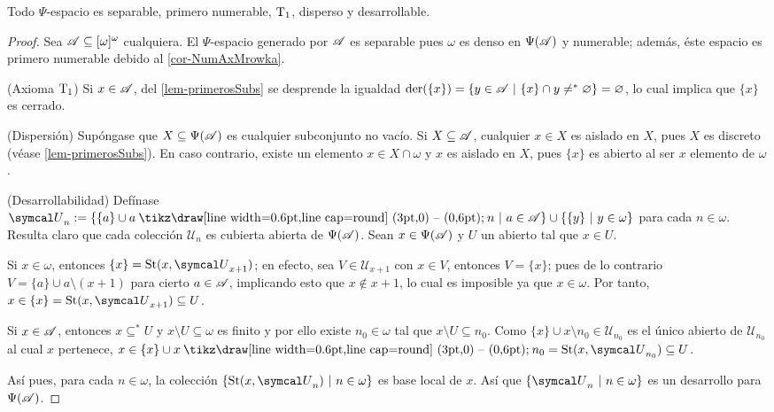 \begin{proposicion}\label{prop-PsiSiempre}
	Todo $\Psi$-espacio es separable, primero numerable, $\operatorname{T}_1$, disperso y desarrollable.
\end{proposicion}

\begin{proof}
	Sea $\mathscr{A} \subseteq [\omega]^\omega$ cualquiera. El $\Psi$-espacio generado por $\mathscr{A}$ es separable pues $\omega$ es denso en $\Psi(\mathscr{A})$ y numerable; además, éste espacio es primero numerable debido al \autoref{cor-NumAxMrowka}.

	(Axioma $\operatorname{T}_1$) Si $x \in \mathscr{A}$, del \autoref{lem-primerosSubs} se desprende la igualdad $\operatorname{der}(\{x\})=\{y \in \mathscr{A} \text{ $|$ } \{x\} \cap y \neq^* \varnothing \}=\varnothing$, lo cual implica que $\{x\}$ es cerrado.

	(Dispersión) Supóngase que $X \subseteq \Psi(\mathscr{A})$ es cualquier subconjunto no vacío. Si $X \subseteq \mathscr{A}$, cualquier $x \in X$ es aislado en $X$, pues $X$ es discreto (véase \ref{lem-primerosSubs}). En caso contrario, existe un elemento $x \in X \cap \omega$ y $x$ es aislado en $X$, pues $\{x\}$ es abierto al ser $x$ elemento de $\omega$.

	(Desarrollabilidad) Defínase $\mathcal{U}_n:=\{ \{a\} \cup a \setminus n \tq a \in \ms{A} \} \cup \{ \{y\} \tq y \in \omega \}$ para cada $n \in \omega$. Resulta claro que cada colección $\mathcal{U}_n$ es cubierta abierta de $\Psi(\mathscr{A})$. Sean $x \in \Psi(\mathscr{A})$ y $U$ un abierto tal que $x \in U$.

	Si $x \in \omega$, entonces $\{x\} = \St(x, \mathcal{U}_{x+1})$; en efecto, sea $V \in \mathcal{U}_{x+1}$ con $x \in V$, entonces $V=\{x\}$; pues de lo contrario $V =\{a\} \cup a \setminus (x+1)$ para cierto $a \in \mathscr{A}$, implicando esto que $x \notin x+1$, lo cual es imposible ya que $x \in \omega$. Por tanto, $x \in \{x\} = \St(x,\mathcal{U}_{x+1}) \subseteq U$.

	Si $x \in \mathscr{A}$, entonces $x \subseteq^* U$ y $x \setminus U \subseteq \omega$ es finito y por ello existe $n_0 \in \omega$ tal que $x \setminus U \subseteq n_0$. Como $\{x\} \cup x \setminus n_0 \in \mathcal{U}_{n_0}$ es el único abierto de $\mathcal{U}_{n_0}$ al cual $x$ pertenece, $x \in \{x\} \cup x \setminus n_0 = \St(x, \mathcal{U}_{n_0}) \subseteq U$.

	Así pues, para cada $n \in \omega$, la colección $\{\St(x, \mathcal{U}_n) \tq n \in \omega\}$ es base local de $x$. Así que $\{\mathcal{U}_n \tq n \in \omega \}$ es un desarrollo para $\Psi(\mathscr{A})$.
\end{proof}

